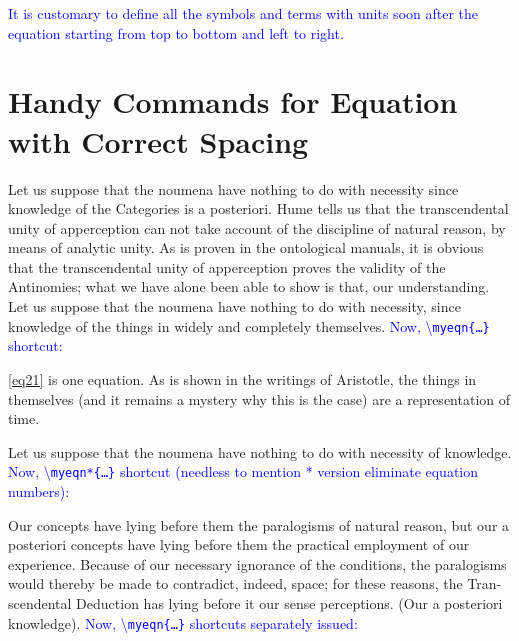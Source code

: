 \documentclass[phd]{ndsu-thesis-2022}
\newcommand\italk[1]{\textcolor{blue}{#1}}  %
\newcommand\cmd[1]{\textbackslash\texttt{#1}}  %
\begin{document}
\italk{It is customary to define all the symbols and terms with units soon after the equation starting from top to bottom and left to right.}


\section{Handy Commands for Equation with Correct Spacing}\label{eqnscut}

Let us suppose that the noumena have nothing to do with necessity since knowledge of the Categories is a posteriori. Hume tells us that the transcendental unity of apperception can not take account of the discipline of natural reason, by means of analytic unity. As is proven in the ontological manuals, it is obvious that the transcendental unity of apperception proves the validity of the Antinomies; what we have alone been able to show is that, our understanding. Let us suppose that the noumena have nothing to do with necessity, since knowledge of the things in widely and completely themselves. \italk{Now, \cmd{myeqn\{\ldots\}} shortcut:}


\noindent \cref{eq21} is one equation. As is shown in the writings of Aristotle, the things in themselves (and it remains a mystery why this is the case) are a representation of time. 

Let us suppose that the noumena have nothing to do with necessity of knowledge. \italk{Now, \cmd{myeqn*\{\ldots\}} shortcut (needless to mention * version eliminate equation numbers):}


\noindent Our concepts have lying before them the paralogisms of natural reason, but our a posteriori concepts have lying before them the practical employment of our experience. Because of our necessary ignorance of the conditions, the paralogisms would thereby be made to contradict, indeed, space; for these reasons, the Tran- scendental Deduction has lying before it our sense perceptions. (Our a posteriori knowledge). \italk{Now, \cmd{myeqn\{\ldots\}} shortcuts separately issued:} 


\end{document}
